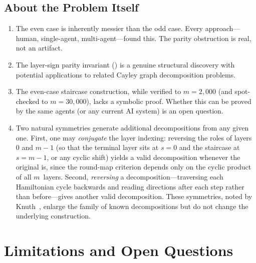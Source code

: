\documentclass[11pt]{article}
\theoremstyle{definition}
\theoremstyle{remark}
\begin{document}
\subsection{About the Problem Itself}

\begin{enumerate}[label=(\alph*)]
    \item The even case is inherently messier than the odd case. Every approach---human, single-agent, multi-agent---found this. The parity obstruction is real, not an artifact.
    \item The layer-sign parity invariant () is a genuine structural discovery with potential applications to related Cayley graph decomposition problems.
    \item The even-case staircase construction, while verified to $m = 2{,}000$ (and spot-checked to $m = 30{,}000$), lacks a symbolic proof. Whether this can be proved by the same agents (or any current AI system) is an open question.
    \item Two natural symmetries generate additional decompositions from any given one. First, one may \emph{conjugate} the layer indexing: reversing the roles of layers $0$ and $m{-}1$ (so that the terminal layer sits at $s = 0$ and the staircase at $s = m{-}1$, or any cyclic shift) yields a valid decomposition whenever the original is, since the round-map criterion depends only on the cyclic product of all $m$~layers. Second, \emph{reversing} a decomposition---traversing each Hamiltonian cycle backwards and reading directions after each step rather than before---gives another valid decomposition. These symmetries, noted by Knuth~\cite{knuth-pc}, enlarge the family of known decompositions but do not change the underlying construction.
\end{enumerate}

\section{Limitations and Open Questions}
\label{sec:limitations}
\end{document}
